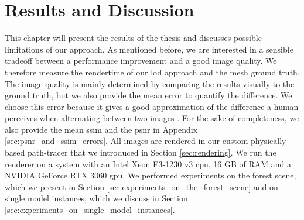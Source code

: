 \chapter{Results and Discussion}
\label{chap:results_and_discussion}
This chapter will present the results of the thesis and discusses possible limitations of our approach.
As mentioned before, we are interested in a sensible tradeoff between a performance improvement and a good image quality.
We therefore measure the rendertime of our \ac{lod} approach and the mesh ground truth.
The image quality is mainly determined by comparing the results visually to the ground truth, but we also provide the mean \FLIP \cite{flip} error to quantify the difference.
We choose this error because it gives a good approximation of the difference a human perceives when alternating between two images \cite{flip}.
For the sake of completeness, we also provide the mean \ac{ssim} and the \ac{psnr} in Appendix \ref{sec:psnr_and_ssim_errors}.
All images are rendered in our custom physically based path-tracer that we introduced in Section \ref{sec:rendering}.
We run the renderer on a system with an Intel Xeon E3-1230 v3 \ac{cpu}, 16 GB of RAM and a NVIDIA GeForce RTX 3060 \ac{gpu}.
We performed experiments on the forest scene, which we present in Section \ref{sec:experiments_on_the_forest_scene} and on single model instances, which we discuss in Section \ref{sec:experiments_on_single_model_instances}.

